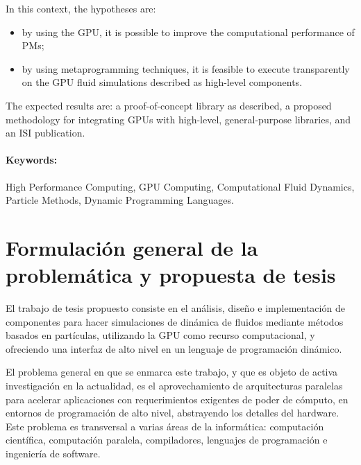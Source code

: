 \documentclass[11pt,spanish]{article}
\begin{document}
In this context, the hypotheses are:
\begin{itemize}
    \item by using the GPU, it is possible to improve the computational
        performance of PMs;
    \item by using metaprogramming techniques, it is feasible to execute
        transparently on the GPU fluid simulations described as high-level
        components.
\end{itemize}

The expected results are:  a proof-of-concept library as described, a proposed
methodology for integrating GPUs with high-level, general-purpose libraries, and
an ISI publication.

\paragraph{Keywords:}
High Performance Computing,
GPU Computing,
Computational Fluid Dynamics,
Particle Methods,
Dynamic Programming Languages.

\newpage
\section{Formulación general de la problemática y propuesta de tesis}

%

El trabajo de tesis propuesto consiste en el análisis, diseño e implementación
de componentes para hacer simulaciones de dinámica de fluidos mediante métodos
basados en partículas, utilizando la GPU como recurso computacional, y
ofreciendo una interfaz de alto nivel en un lenguaje de programación dinámico.

El problema general en que se enmarca este trabajo, y que es objeto de activa
investigación en la actualidad, es el aprovechamiento de arquitecturas paralelas
para acelerar aplicaciones con requerimientos exigentes de poder de cómputo, en
entornos de programación de alto nivel, abstrayendo los detalles del hardware.
Este problema es transversal a varias áreas de la informática: computación
científica, computación paralela, compiladores, lenguajes de programación e
ingeniería de software.
\end{document}
